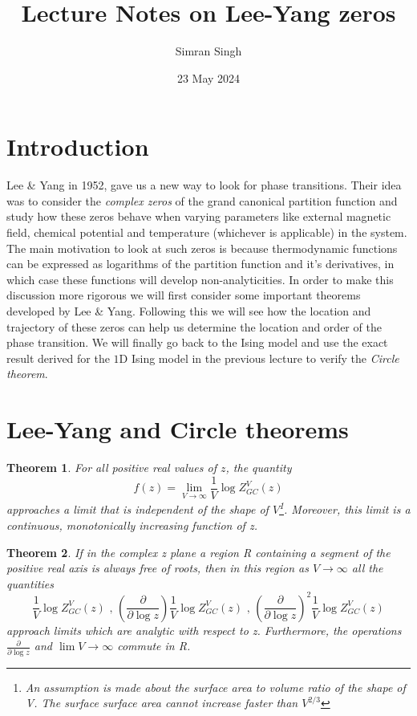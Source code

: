 \documentclass[11pt,a4paper]{article}
\newtheorem{theorem}{Theorem}[section]
\begin{document}
\title{Lecture Notes on Lee-Yang zeros}
\author{Simran Singh}
\date{23 May 2024}
\maketitle

\tableofcontents
\newpage

\section{Introduction}
Lee \& Yang in 1952, gave us a new way to look for phase transitions. Their idea was to consider the \emph{complex zeros} of the grand canonical partition function and study how these zeros behave when varying parameters like external magnetic field, chemical potential and temperature (whichever is applicable) in the system. The main motivation to look at such zeros is because thermodynamic functions can be expressed as logarithms of the partition function and it's derivatives, in which case these functions will develop non-analyticities. In order to make this discussion more rigorous we will first consider some important theorems developed by Lee \& Yang. Following this we will see how the location and trajectory of these zeros can help us determine the location and order of the phase transition. We will finally go back to the Ising model and use the exact result derived for the $1$D Ising model in the previous lecture to verify the \emph{Circle theorem}.

\section{Lee-Yang and Circle theorems}

\begin{theorem}
For all positive real values of $z$, the quantity
\begin{equation}
    f(z) = \lim_{V \to \infty} \frac{1}{V} \log Z^V_{GC}(z)
\end{equation}
approaches a limit that is independent of the shape of $V$\footnote{An assumption is made about the surface area to volume ratio of the shape of V. The surface surface area cannot increase faster than $V^{2/3}$}. Moreover, this limit is a continuous, monotonically increasing function of z.
\end{theorem}

\begin{theorem}
If in the complex z plane a region R containing a segment of the positive real axis is always free of roots, then in this region as $V \to \infty$ all the quantities
\begin{equation}
    \frac{1}{V} \log Z^V_{GC}(z) \,\,, \, \left(\frac{\partial}{\partial \log z}\right) \frac{1}{V} \log Z^V_{GC}(z) \,\,,\, \left(\frac{\partial}{\partial \log z}\right)^2 \frac{1}{V} \log Z^V_{GC}(z)
\end{equation}
approach limits which are analytic with respect to z. Furthermore, the operations $\frac{\partial}{\partial \log z}$ and $\lim V \to \infty$ commute in R.
\end{theorem}
\end{document}
